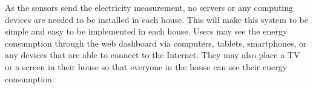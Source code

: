 As the sensors send the electricity measurement, no servers or any computing devices are needed to be installed in each house. This will make this system to be simple and easy to be implemented in each house. Users may see the energy consumption through the web dashboard via computers, tablets, smartphones, or any devices that are able to connect to the Internet. They may also place a TV or a screen in their house so that everyone in the house can see their energy consumption.